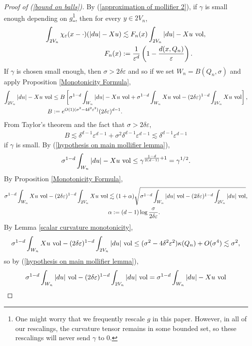 \begin{proof}[Proof of (\ref{bound on balls})]
By (\ref{approximation of mollifier 2}), if $\gamma$ is small enough depending on $g$\footnote{One might worry that we frequently rescale $g$ in this paper.
However, in all of our rescalings, the curvature tensor remains in some bounded set, so these rescalings will never send $\gamma$ to $0$.}, then for every $y \in 2V_n$,
\begin{align*}
\int_{2V_n} \chi_\varepsilon(x - \cdot)(|du| - Xu) &\lesssim F_n(x) \int_{2V_n} |du| - Xu ~\mathrm{vol}, \\
F_n(x) &:= \frac{1}{\varepsilon^d}\left(1 - \frac{d(x, Q_n)}{\varepsilon}\right).
\end{align*}
If $\gamma$ is chosen small enough, then $\sigma > 2\delta\varepsilon$ and so if we set $W_n = B(Q_n, \sigma)$ and apply Proposition \ref{Monotonicity Formula},
\begin{align*}
\int_{2V_n}|du| - Xu ~\mathrm{vol} &\leq
B \left[\sigma^{1 - d}\int_{W_n} |du| - Xu ~\mathrm{vol} + \sigma^{1 - d}\int_{W_n} Xu ~\mathrm{vol} - (2\delta\varepsilon)^{1 - d}\int_{2V_n} Xu ~\mathrm{vol} \right],\\
B &:= e^{O(1)(\sigma^2 - 4\delta^2\varepsilon^2)}(2\delta\varepsilon)^{d - 1}.
\end{align*}
From Taylor's theorem and the fact that $\sigma > 2\delta\varepsilon$,
\begin{align*}
B \lesssim \delta^{d - 1} \varepsilon^{d - 1} + \sigma^2 \delta^{d - 1} \varepsilon^{d - 1} \lesssim \delta^{d - 1} \varepsilon^{d - 1}
\end{align*}
if $\gamma$ is small.
By (\ref{hypothesis on main mollifier lemma}),
$$\sigma^{1 - d}\int_{W_n} |du| - Xu ~\mathrm{vol} \leq \gamma^{\frac{1 - d}{2(d - 1)} + 1} = \gamma^{1/2}.$$
By Proposition \ref{Monotonicity Formula},
\begin{align*}
\sigma^{1 - d}\int_{W_n} Xu ~\mathrm{vol} - (2\delta\varepsilon)^{1 - d}\int_{2V_n} Xu ~\mathrm{vol} &\lesssim (1 + \alpha)\sqrt{\sigma^{1 - d} \int_{W_n} |du| ~\mathrm{vol} - (2\delta\varepsilon)^{1 - d} \int_{2V_n} |du| ~\mathrm{vol}},\\
&\alpha := (d - 1)\log \frac{\sigma}{2\delta\varepsilon}.
\end{align*}
By Lemma \ref{scalar curvature monotonicity},
$$\sigma^{1 - d} \int_{W_n} X u ~\mathrm{vol} - (2\delta\varepsilon)^{1 - d} \int_{2V_n} |du| ~\mathrm{vol} \leq (\sigma^2 -4\delta^2\varepsilon^2) \kappa(Q_n) + O(\sigma^4) \lesssim \sigma^2,$$
so by (\ref{hypothesis on main mollifier lemma}),
\begin{align*}
\sigma^{1 - d} \int_{W_n} |du| ~\vol - (2\delta\varepsilon)^{1 - d} \int_{2V_n} |du| ~\vol &= \sigma^{1 - d} \int_{W_n} |du| - Xu ~\vol \\

\end{align*}
\end{proof}
